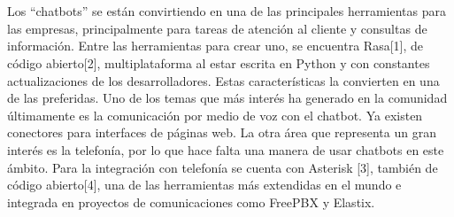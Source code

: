 \chapter{}

Los “chatbots” se están convirtiendo en una de las principales herramientas para las empresas, principalmente para tareas de atención al cliente y consultas de información.
Entre las herramientas para crear uno, se encuentra Rasa[1], de código abierto[2], multiplataforma al estar escrita en Python y con constantes actualizaciones de los desarrolladores. Estas características la convierten en una de las preferidas.
Uno de los temas que más interés ha generado en la comunidad últimamente es la comunicación por medio de voz con el chatbot. Ya existen conectores para interfaces de páginas web. La otra área que representa un gran interés es la telefonía, por lo que hace falta una manera de usar chatbots en este ámbito.
Para la integración con telefonía se cuenta con Asterisk [3], también de código abierto[4], una de las herramientas más extendidas en el mundo e integrada en proyectos de comunicaciones como FreePBX y Elastix.